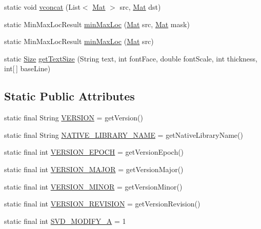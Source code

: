 \begin{DoxyCompactItemize}
\item 
static void \mbox{\hyperlink{classorg_1_1opencv_1_1core_1_1_core_a8dee19abadf7067469cd4532a2fd62fd}{vconcat}} (List$<$ \mbox{\hyperlink{classorg_1_1opencv_1_1core_1_1_mat}{Mat}} $>$ src, \mbox{\hyperlink{classorg_1_1opencv_1_1core_1_1_mat}{Mat}} dst)
\item 
static Min\+Max\+Loc\+Result \mbox{\hyperlink{classorg_1_1opencv_1_1core_1_1_core_a87987114238d2094a01395f12d6a9367}{min\+Max\+Loc}} (\mbox{\hyperlink{classorg_1_1opencv_1_1core_1_1_mat}{Mat}} src, \mbox{\hyperlink{classorg_1_1opencv_1_1core_1_1_mat}{Mat}} mask)
\item 
static Min\+Max\+Loc\+Result \mbox{\hyperlink{classorg_1_1opencv_1_1core_1_1_core_af85a1994a360e2c955622a2583de1d81}{min\+Max\+Loc}} (\mbox{\hyperlink{classorg_1_1opencv_1_1core_1_1_mat}{Mat}} src)
\item 
static \mbox{\hyperlink{classorg_1_1opencv_1_1core_1_1_size}{Size}} \mbox{\hyperlink{classorg_1_1opencv_1_1core_1_1_core_ab6071e8e7cb8266aad46d7d95cb73fe7}{get\+Text\+Size}} (String text, int font\+Face, double font\+Scale, int thickness, int\mbox{[}$\,$\mbox{]} base\+Line)
\end{DoxyCompactItemize}
\subsection*{Static Public Attributes}
\begin{DoxyCompactItemize}
\item 
static final String \mbox{\hyperlink{classorg_1_1opencv_1_1core_1_1_core_a8b5aa972c9a65c4dc8da80aa97a9e0d6}{V\+E\+R\+S\+I\+ON}} = get\+Version()
\item 
static final String \mbox{\hyperlink{classorg_1_1opencv_1_1core_1_1_core_a6f74a56e173ada31969137d7d80d44b5}{N\+A\+T\+I\+V\+E\+\_\+\+L\+I\+B\+R\+A\+R\+Y\+\_\+\+N\+A\+ME}} = get\+Native\+Library\+Name()
\item 
static final int \mbox{\hyperlink{classorg_1_1opencv_1_1core_1_1_core_aed42db3ccc84e356b8d432c0271e9ee7}{V\+E\+R\+S\+I\+O\+N\+\_\+\+E\+P\+O\+CH}} = get\+Version\+Epoch()
\item 
static final int \mbox{\hyperlink{classorg_1_1opencv_1_1core_1_1_core_a4c31c533f50245f45626ce220e67638d}{V\+E\+R\+S\+I\+O\+N\+\_\+\+M\+A\+J\+OR}} = get\+Version\+Major()
\item 
static final int \mbox{\hyperlink{classorg_1_1opencv_1_1core_1_1_core_a8c815d0d147f2ec108adc1ead0107822}{V\+E\+R\+S\+I\+O\+N\+\_\+\+M\+I\+N\+OR}} = get\+Version\+Minor()
\item 
static final int \mbox{\hyperlink{classorg_1_1opencv_1_1core_1_1_core_ae29e5d49ffed39a7b12e44d4101ad944}{V\+E\+R\+S\+I\+O\+N\+\_\+\+R\+E\+V\+I\+S\+I\+ON}} = get\+Version\+Revision()
\item 
static final int \mbox{\hyperlink{classorg_1_1opencv_1_1core_1_1_core_a0d0df5fd9960ef75c8256603419f345d}{S\+V\+D\+\_\+\+M\+O\+D\+I\+F\+Y\+\_\+A}} = 1
\end{DoxyCompactItemize}


